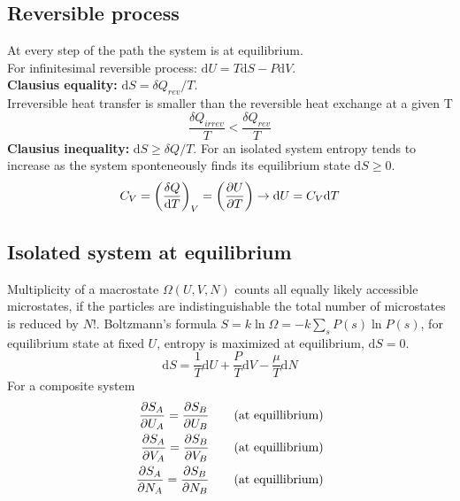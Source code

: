 \documentclass[a4paper, norsk, 8pt]{article}
\begin{document}
\begin{multicols*}{3}
\subsection*{\footnotesize  Reversible process}
At every step of the path the system is at equilibrium.\\ For infinitesimal reversible process: $\mbox{d}U = T\mbox{d}S - P \mbox{d}V$.\\
\textbf{Clausius equality:} $\mbox{d}S = \delta Q_{rev}/T$.\\
Irreversible	heat	transfer		is	smaller than the reversible	heat
exchange at	a	given	T
$$\frac{\delta Q_{irrev}}{T}  < \frac{\delta Q_{rev}}{T} $$
\textbf{Clausius inequality:} $\mbox{d}S \geq \delta Q/T$. For an isolated system entropy tends to	increase as	the system	sponteneously finds its equilibrium state $\mbox{d}S \geq 0$.
\begin{align*}
  C_V = \left( \frac{\delta Q}{\mbox{d}T} \right)_V = \left( \pdv{U}{T} \right) \rightarrow \mbox{d}U = C_V \mbox{d}T
\end{align*}

\subsection*{\footnotesize  Isolated system at equilibrium}
Multiplicity of a macrostate $\Omega(U,V,N)$ counts all equally likely accessible microstates, if the particles are indistinguishable the total number of microstates is reduced by $N!$. Boltzmann's formula $S=k\ln{\Omega} = -k\sum_{s}P(s)\ln{P(s)}$, for equilibrium state at fixed $U$, entropy is maximized at equilibrium, $\mbox{d}S=0$.
\begin{equation*}
    \mbox{d}S = \frac{1}{T}\mbox{d}U  + \frac{P}{T}\mbox{d}V - \frac{\mu}{T}\mbox{d}N
\end{equation*}
For a composite system
\begin{align*}
  \pdv{S_A}{U_A} = \pdv{S_B}{U_B} \qquad (\text{at equillibrium}) \\
  \pdv{S_A}{V_A} = \pdv{S_B}{V_B} \qquad (\text{at equillibrium}) \\
  \pdv{S_A}{N_A} = \pdv{S_B}{N_B} \qquad (\text{at equillibrium})
\end{align*}


\end{multicols*}
\end{document}
